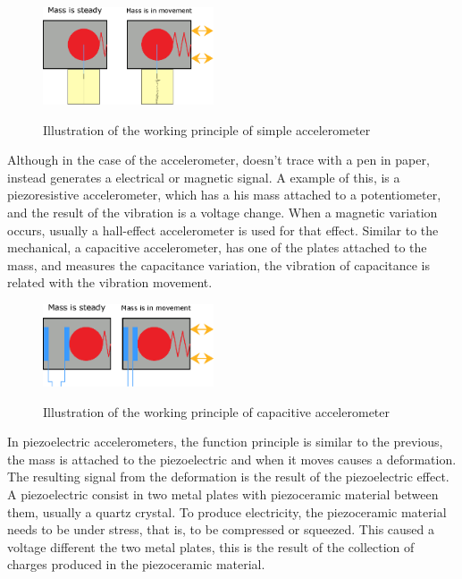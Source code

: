 \begin{figure}[!htb]
    \centering
    \includegraphics[width=0.45\textwidth]{Chapters/2CHP/Diagrams/seismometer.eps}
    \caption{Illustration of the working principle of simple accelerometer}{}    
    \label{fig:seismometer}
\end{figure}
Although in the case of the accelerometer, doesn't trace with a pen in paper, instead generates a electrical or magnetic signal. A example of this, is a piezoresistive accelerometer, which has a his mass attached to a potentiometer, and the result of the vibration is a voltage change. When a magnetic variation occurs, usually a hall-effect accelerometer is used for that effect.  
Similar to the mechanical, a capacitive accelerometer, has one of the plates attached to the mass, and measures the capacitance variation, the vibration of capacitance is related with the vibration movement. 
\begin{figure}[!htb]
    \centering
    \includegraphics[width=0.45\textwidth]{Chapters/2CHP/Diagrams/capacitiveacc.eps}
    \caption{Illustration of the working principle of capacitive accelerometer}{}    
    \label{fig:capacitiveacc}
\end{figure}
In piezoelectric accelerometers, the function principle is similar to the previous, the mass is attached to the piezoelectric and when it moves causes a deformation. The resulting signal from the deformation is the result of the piezoelectric effect. A piezoelectric consist in two metal plates with piezoceramic material between them, usually a quartz crystal. To produce electricity, the piezoceramic material needs to be under stress, that is, to be compressed or squeezed. This caused a voltage different the two metal plates, this is the result of the collection of charges produced in the piezoceramic material.
